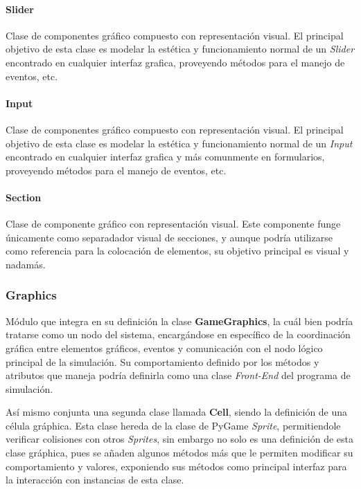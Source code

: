 \documentclass[]{article}
\begin{document}
			\paragraph{Slider}
				Clase de componentes gráfico compuesto con representación visual. El principal objetivo de esta clase es modelar la estética y funcionamiento normal de un \textit{Slider} encontrado en cualquier interfaz grafica, proveyendo métodos para el manejo de eventos, etc.
				
			\paragraph{Input}
				Clase de componentes gráfico compuesto con representación visual. El principal objetivo de esta clase es modelar la estética y funcionamiento normal de un \textit{Input} encontrado en cualquier interfaz grafica y más comunmente en formularios, proveyendo métodos para el manejo de eventos, etc.
				
			\paragraph{Section}
				Clase de componente gráfico con representación visual. Este componente funge únicamente como separadador visual de secciones, y aunque podría utilizarse como referencia para la colocación de elementos, su objetivo principal es visual y nadamás.
				
			
			
		
		\subsubsection{Graphics}
			Módulo que integra en su definición la clase \textbf{GameGraphics}, la cuál bien podría tratarse como un nodo del sistema, encargándose en específico de la coordinación gráfica entre elementos gráficos, eventos y comunicación con el nodo lógico principal de la simulación. Su comportamiento definido por los métodos y atributos que maneja podría definirla como una clase \textit{Front-End} del programa de simulación.
			
			Así mismo conjunta una segunda clase llamada \textbf{Cell}, siendo la definición de una célula gráphica. Esta clase hereda de la clase de PyGame \textit{Sprite}, permitiendole verificar colisiones con otros \textit{Sprites}, sin embargo no solo es una definición de esta clase gráphica, pues se añaden algunos métodos más que le permiten modificar su comportamiento y valores, exponiendo sus métodos como principal interfaz para la interacción con instancias de esta clase.
			
\end{document}

